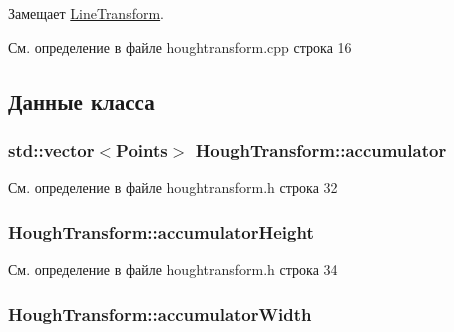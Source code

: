 Замещает \hyperlink{class_line_transform_a391ea9da214224bd3fe428a41c271761}{Line\+Transform}.



См. определение в файле houghtransform.\+cpp строка 16



\subsection{Данные класса}
\subsubsection[{\texorpdfstring{accumulator}{accumulator}}]{\setlength{\rightskip}{0pt plus 5cm}std\+::vector$<${\bf Points}$>$ Hough\+Transform\+::accumulator\hspace{0.3cm}{\ttfamily [private]}}\hypertarget{class_hough_transform_aaa271ada2195b2f0dba1a4611648fc2f}{}\label{class_hough_transform_aaa271ada2195b2f0dba1a4611648fc2f}


См. определение в файле houghtransform.\+h строка 32

\subsubsection[{\texorpdfstring{accumulator\+Height}{accumulatorHeight}}]{ Hough\+Transform\+::accumulator\+Height\hspace{0.3cm}{\ttfamily [private]}}\hypertarget{class_hough_transform_aee054a46260dc381123d158617c0e7dc}{}\label{class_hough_transform_aee054a46260dc381123d158617c0e7dc}


См. определение в файле houghtransform.\+h строка 34

\subsubsection[{\texorpdfstring{accumulator\+Width}{accumulatorWidth}}]{ Hough\+Transform\+::accumulator\+Width\hspace{0.3cm}{\ttfamily [private]}}\hypertarget{class_hough_transform_a1c2b5fa2274a44848f8737f396397137}{}\label{class_hough_transform_a1c2b5fa2274a44848f8737f396397137}


